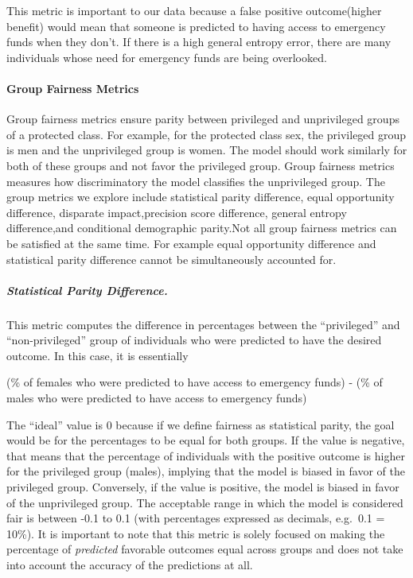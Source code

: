 \documentclass[water,article,submit,moreauthors,pdftex]{mdpi}
\begin{document}
This metric is important to our data because a false positive
outcome(higher benefit) would mean that someone is predicted to having
access to emergency funds when they don't. If there is a high general
entropy error, there are many individuals whose need for emergency funds
are being overlooked.

\hypertarget{group-fairness-metrics}{%
\paragraph{Group Fairness Metrics}\label{group-fairness-metrics}}

Group fairness metrics ensure parity between privileged and unprivileged
groups of a protected class. For example, for the protected class sex,
the privileged group is men and the unprivileged group is women. The
model should work similarly for both of these groups and not favor the
privileged group. Group fairness metrics measures how discriminatory the
model classifies the unprivileged
group\citep{binns2020apparent, mehrabi2021survey, caton2020fairness}.
The group metrics we explore include statistical parity difference,
equal opportunity difference, disparate impact,precision score
difference, general entropy difference,and conditional demographic
parity.Not all group fairness metrics can be satisfied at the same time.
For example equal opportunity difference and statistical parity
difference cannot be simultaneously accounted
for\citep{kypraiou_what_2021}.

\hypertarget{statistical-parity-difference.}{%
\subparagraph{Statistical Parity
Difference.}\label{statistical-parity-difference.}}

This metric computes the difference in percentages between the
``privileged'' and ``non-privileged'' group of individuals who were
predicted to have the desired outcome. In this case, it is essentially

(\% of females who were predicted to have access to emergency funds) -
(\% of males who were predicted to have access to emergency funds)

The ``ideal'' value is 0 because if we define fairness as statistical
parity, the goal would be for the percentages to be equal for both
groups. If the value is negative, that means that the percentage of
individuals with the positive outcome is higher for the privileged group
(males), implying that the model is biased in favor of the privileged
group. Conversely, if the value is positive, the model is biased in
favor of the unprivileged group. The acceptable range in which the model
is considered fair is between -0.1 to 0.1 (with percentages expressed as
decimals, e.g.~0.1 = 10\%). It is important to note that this metric is
solely focused on making the percentage of \emph{predicted} favorable
outcomes equal across groups and does not take into account the accuracy
of the predictions at all.\citep{caton2020fairness, kypraiou_what_2021}
\end{document}

